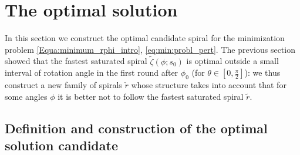 \documentclass[reqno]{amsart}
\theoremstyle{definition} \newtheorem{definition}{Definition}[section]
\theoremstyle{definition} \newtheorem{remark}[definition]{Remark}
\theoremstyle{plain} \newtheorem{lemma}[definition]{Lemma}
\theoremstyle{plain} \newtheorem{proposition}[definition]{Proposition}
\theoremstyle{plain} \newtheorem{theorem}[definition]{Theorem}
\theoremstyle{plain} \newtheorem{corollary}[definition]{Corollary}
\theoremstyle{definition} \newtheorem{example}[definition]{Example}
\theoremstyle{plain} \newtheorem{claim}[clai]{Claim}
\theoremstyle{definition} \newtheorem{assumption}[definition]{Assumption}
\theoremstyle{definition} \newtheorem{observation}[definition]{Observation}
\newcommand{\ind}{1\!\!\mathrm{I}}
\newcommand{\1}{\mathbbm 1}
\numberwithin{equation}{section} %
\theoremstyle{plain} \newtheorem*{theorem*}{Theorem}
\theoremstyle{plain} \newtheorem{mthm}[maintheorem]{Main Theorem}
\theoremstyle{plain} \newtheorem*{mthm*}{Main Theorem}
\theoremstyle{plain} \newtheorem*{conjecture*}{Conjecture}
\theoremstyle{plain} \newtheorem{conjecture}[definition]{Conjecture}
\theoremstyle{plain} \newtheorem*{problem*}{Problem}
\begin{document}
%
%
%
%
%

\section{The optimal solution}
\label{S:optimal_solut}



In this section we construct the optimal candidate spiral for the minimization problem \eqref{Equa:minimum_rphi_intro}, \eqref{eq:min:probl_pert}. The previous section showed that the fastest saturated spiral $\tilde \zeta(\phi;s_0)$ is optimal outside a small interval of rotation angle in the first round after $\phi_0$ (for $\theta \in [0,\frac{\pi}{2}]$): we thus construct a new family of spirals $\check r$ whose structure takes into account that for some angles $\phi$ it is better not to follow the fastest saturated spiral $\tilde r$.


\subsection{Definition and construction of the optimal solution candidate}
\label{Ss:optimal_sol_def}
\end{document}
